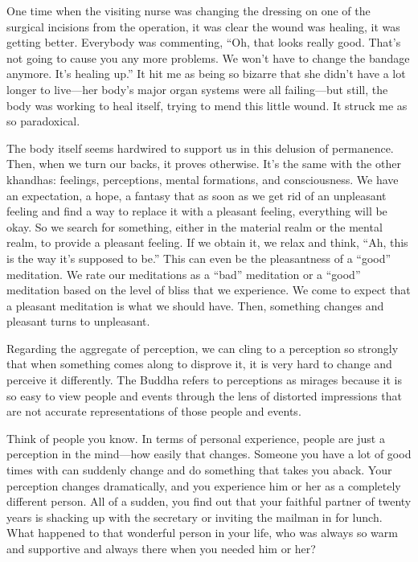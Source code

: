 One time when the visiting nurse was changing the dressing on one of the surgical incisions from the operation, it was clear the wound was healing, it was getting better. Everybody was commenting, ``Oh, that looks really good. That's not going to cause you any more problems. We won't have to change the bandage anymore. It's healing up.'' It hit me as being so bizarre that she didn't have a lot longer to live---her body's major organ systems were all failing---but still, the body was working to heal itself, trying to mend this little wound. It struck me as so paradoxical.

The body itself seems hardwired to support us in this delusion of permanence. Then, when we turn our backs, it proves otherwise. It's the same with the other khandhas: feelings, perceptions, mental formations, and consciousness. We have an expectation, a hope, a fantasy that as soon as we get rid of an unpleasant feeling and find a way to replace it with a pleasant feeling, everything will be okay. So we search for something, either in the material realm or the mental realm, to provide a pleasant feeling. If we obtain it, we relax and think, ``Ah, this is the way it's supposed to be.'' This can even be the pleasantness of a ``good'' {meditation. We rate our meditations as a} ``bad'' meditation or a ``good'' meditation based on the level of bliss that we experience. We come to expect that a pleasant meditation is what we should have. Then, something changes and pleasant turns to unpleasant.{\parfillskip=0pt \par}

Regarding the aggregate of perception, we can cling to a perception so strongly that when something comes along to disprove it, it is very hard to change and perceive it differently. The Buddha refers to perceptions as mirages because it is so easy to view people and events through the lens of distorted impressions that are not accurate representations of those people and events.

Think of people you know. In terms of personal experience, people are just a perception in the mind---how easily that changes. Someone you have a lot of good times with can suddenly change and do something that takes you aback. Your perception changes dramatically, and you experience him or her as a completely different person. All of a sudden, you find out that your faithful partner of twenty years is shacking up with the secretary or inviting the mailman in for lunch. What happened to that wonderful person in your life, who was always so warm and supportive and always there when you needed him or her?

